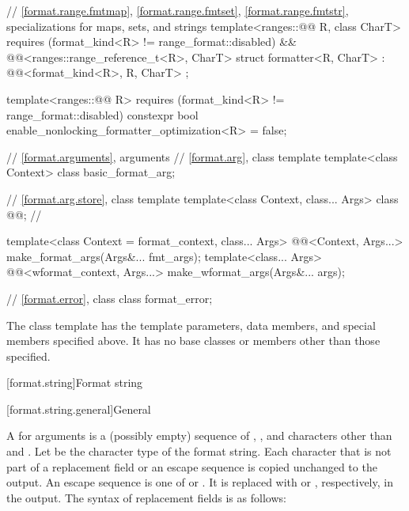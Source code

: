 \begin{codeblock}
{  // \ref{format.range.fmtmap}, \ref{format.range.fmtset}, \ref{format.range.fmtstr}, specializations for maps, sets, and strings
  template<ranges::@@ R, class CharT>
    requires (format_kind<R> != range_format::disabled) &&
             @@<ranges::range_reference_t<R>, CharT>
  struct formatter<R, CharT> : @@<format_kind<R>, R, CharT> { };

  template<ranges::@@ R>
    requires (format_kind<R> != range_format::disabled)
    constexpr bool enable_nonlocking_formatter_optimization<R> = false;

  // \ref{format.arguments}, arguments
  // \ref{format.arg}, class template 
  template<class Context> class basic_format_arg;

  // \ref{format.arg.store}, class template 
  template<class Context, class... Args> class @@;        // \expos

  template<class Context = format_context, class... Args>
    @@<Context, Args...>
      make_format_args(Args&... fmt_args);
  template<class... Args>
    @@<wformat_context, Args...>
      make_wformat_args(Args&... args);

  // \ref{format.error}, class 
  class format_error;
}
\end{codeblock}


\pnum
The class template 
has the template parameters, data members, and special members specified above. It has no base classes or members other than those specified.

[format.string]{Format string}

[format.string.general]{General}

\pnum
A  for arguments  is
a (possibly empty) sequence of
,
,
and characters other than \tcode{\{} and \tcode{\}}.
Let  be the character type of the format string.
Each character that is not part of
a replacement field or an escape sequence
is copied unchanged to the output.
An escape sequence is one of \tcode{\{\{} or \tcode{\}\}}.
It is replaced with \tcode{\{} or \tcode{\}}, respectively, in the output.
The syntax of replacement fields is as follows:

